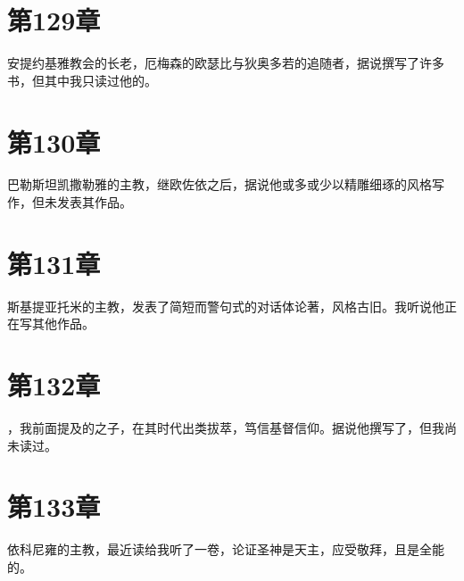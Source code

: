 \section{第129章}

安提约基雅教会的长老，厄梅森的欧瑟比与狄奥多若的追随者，据说撰写了许多书，但其中我只读过他的。\par


\section{第130章}

巴勒斯坦凯撒勒雅的主教，继欧佐依之后，据说他或多或少以精雕细琢的风格写作，但未发表其作品。\par


\section{第131章}

斯基提亚托米的主教，发表了简短而警句式的对话体论著，风格古旧。我听说他正在写其他作品。\par


\section{第132章}

，我前面提及的之子，在其时代出类拔萃，笃信基督信仰。据说他撰写了，但我尚未读过。\par


\section{第133章}

依科尼雍的主教，最近读给我听了一卷，论证圣神是天主，应受敬拜，且是全能的。\par


